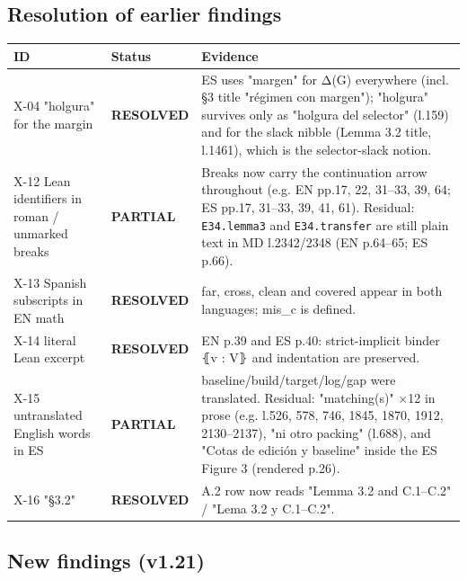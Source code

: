 \documentclass[
]{article}
\newcounter{none} %
\begin{document}
\subsection{Resolution of earlier
findings}\label{resolution-of-earlier-findings}

{\def\LTcaptype{none} %
\begin{longtable}[]{@{}lll@{}}
\toprule\noalign{}
ID & Status & Evidence \\
\midrule\noalign{}
\endhead
\bottomrule\noalign{}
\endlastfoot
X-04 "holgura" for the margin & \textbf{RESOLVED} & ES uses "margen" for
Δ(G) everywhere (incl. §3 title "régimen con margen"); "holgura"
survives only as "holgura del selector" (l.159) and for the slack nibble
(Lemma 3.2 title, l.1461), which is the selector-slack notion. \\
X-12 Lean identifiers in roman / unmarked breaks & \textbf{PARTIAL} &
Breaks now carry the continuation arrow throughout (e.g. EN pp.17, 22,
31--33, 39, 64; ES pp.17, 31--33, 39, 41, 61). Residual:
\texttt{E34.lemma3} and \texttt{E34.transfer} are still plain text in MD
l.2342/2348 (EN p.64--65; ES p.66). \\
X-13 Spanish subscripts in EN math & \textbf{RESOLVED} & far, cross,
clean and covered appear in both languages; mis\_c is defined. \\
X-14 literal Lean excerpt & \textbf{RESOLVED} & EN p.39 and ES p.40:
strict-implicit binder ⦃v : V⦄ and indentation are preserved. \\
X-15 untranslated English words in ES & \textbf{PARTIAL} &
baseline/build/target/log/gap were translated. Residual: "matching(s)"
×12 in prose (e.g. l.526, 578, 746, 1845, 1870, 1912, 2130--2137), "ni
otro packing" (l.688), and "Cotas de edición y baseline" inside the ES
Figure 3 (rendered p.26). \\
X-16 "§3.2" & \textbf{RESOLVED} & A.2 row now reads "Lemma 3.2 and
C.1--C.2" / "Lema 3.2 y C.1--C.2". \\
\end{longtable}
}

\subsection{New findings (v1.21)}\label{new-findings-v121}
\end{document}
